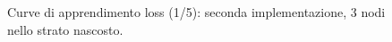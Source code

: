 \documentclass[a4paper,12pt]{article}
\begin{document}
\begin{figure}[htb]
    \centering
    \caption{Curve di apprendimento loss (1/5): seconda implementazione, 3 nodi nello strato nascosto.}
    \label{fig6}
\end{figure}
\end{document}
